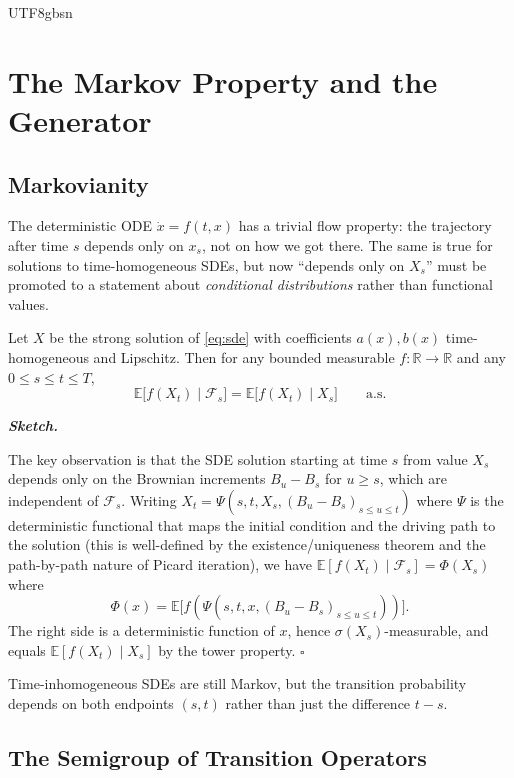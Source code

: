 \documentclass{article}
\newenvironment{proof}[1][Proof]{%
  \par\smallskip\noindent\textit{\textbf{#1.}}\quad\ignorespaces
}{%
  \hfill$\square$\par\smallskip
}
\begin{document}
\begin{CJK*}{UTF8}{gbsn}
\section{The Markov Property and the Generator}

\subsection{Markovianity}

The deterministic ODE $\dot x=f(t,x)$ has a trivial flow property: the trajectory after time $s$ depends only on $x_s$, not on how we got there. The same is true for solutions to time-homogeneous SDEs, but now ``depends only on $X_s$'' must be promoted to a statement about \emph{conditional distributions} rather than functional values.

\begin{theorem}\label{thm:markov}
Let $X$ be the strong solution of \eqref{eq:sde} with coefficients $a(x),b(x)$ time-homogeneous and Lipschitz. Then for any bounded measurable $f:\mathbb{R}\to\mathbb{R}$ and any $0\le s\le t\le T$,
\[
  \mathbb{E}\bigl[f(X_t)\mid \mathcal{F}_s\bigr]=\mathbb{E}\bigl[f(X_t)\mid X_s\bigr]\qquad\text{a.s.}
\]
\end{theorem}

\begin{proof}[Sketch]
The key observation is that the SDE solution starting at time $s$ from value $X_s$ depends only on the Brownian increments $B_u-B_s$ for $u\ge s$, which are independent of $\mathcal{F}_s$. Writing $X_t=\Psi(s,t,X_s,(B_u-B_s)_{s\le u\le t})$ where $\Psi$ is the deterministic functional that maps the initial condition and the driving path to the solution (this is well-defined by the existence/uniqueness theorem and the path-by-path nature of Picard iteration), we have $\mathbb{E}[f(X_t)\mid\mathcal{F}_s]=\Phi(X_s)$ where
\[
  \Phi(x)=\mathbb{E}\bigl[f(\Psi(s,t,x,(B_u-B_s)_{s\le u\le t}))\bigr].
\]
The right side is a deterministic function of $x$, hence $\sigma(X_s)$-measurable, and equals $\mathbb{E}[f(X_t)\mid X_s]$ by the tower property.
\end{proof}

Time-inhomogeneous SDEs are still Markov, but the transition probability depends on both endpoints $(s,t)$ rather than just the difference $t-s$.

\subsection{The Semigroup of Transition Operators}


\end{CJK*}
\end{document}
